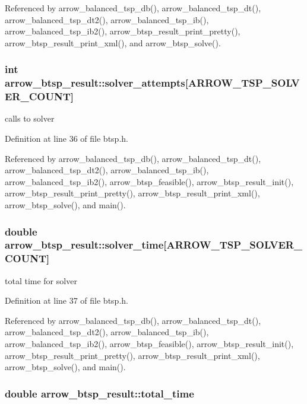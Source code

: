 Referenced by arrow\_\-balanced\_\-tsp\_\-db(), arrow\_\-balanced\_\-tsp\_\-dt(), arrow\_\-balanced\_\-tsp\_\-dt2(), arrow\_\-balanced\_\-tsp\_\-ib(), arrow\_\-balanced\_\-tsp\_\-ib2(), arrow\_\-btsp\_\-result\_\-print\_\-pretty(), arrow\_\-btsp\_\-result\_\-print\_\-xml(), and arrow\_\-btsp\_\-solve().\hypertarget{structarrow__btsp__result_b1d423ab6eda81de4c3bde1685976593}{
\subsubsection[{solver\_\-attempts}]{\setlength{\rightskip}{0pt plus 5cm}int {\bf arrow\_\-btsp\_\-result::solver\_\-attempts}\mbox{[}ARROW\_\-TSP\_\-SOLVER\_\-COUNT\mbox{]}}}
\label{structarrow__btsp__result_b1d423ab6eda81de4c3bde1685976593}


calls to solver 

Definition at line 36 of file btsp.h.

Referenced by arrow\_\-balanced\_\-tsp\_\-db(), arrow\_\-balanced\_\-tsp\_\-dt(), arrow\_\-balanced\_\-tsp\_\-dt2(), arrow\_\-balanced\_\-tsp\_\-ib(), arrow\_\-balanced\_\-tsp\_\-ib2(), arrow\_\-btsp\_\-feasible(), arrow\_\-btsp\_\-result\_\-init(), arrow\_\-btsp\_\-result\_\-print\_\-pretty(), arrow\_\-btsp\_\-result\_\-print\_\-xml(), arrow\_\-btsp\_\-solve(), and main().\hypertarget{structarrow__btsp__result_f13227603570821a0ba7d6466f39f00c}{
\subsubsection[{solver\_\-time}]{\setlength{\rightskip}{0pt plus 5cm}double {\bf arrow\_\-btsp\_\-result::solver\_\-time}\mbox{[}ARROW\_\-TSP\_\-SOLVER\_\-COUNT\mbox{]}}}
\label{structarrow__btsp__result_f13227603570821a0ba7d6466f39f00c}


total time for solver 

Definition at line 37 of file btsp.h.

Referenced by arrow\_\-balanced\_\-tsp\_\-db(), arrow\_\-balanced\_\-tsp\_\-dt(), arrow\_\-balanced\_\-tsp\_\-dt2(), arrow\_\-balanced\_\-tsp\_\-ib(), arrow\_\-balanced\_\-tsp\_\-ib2(), arrow\_\-btsp\_\-feasible(), arrow\_\-btsp\_\-result\_\-init(), arrow\_\-btsp\_\-result\_\-print\_\-pretty(), arrow\_\-btsp\_\-result\_\-print\_\-xml(), arrow\_\-btsp\_\-solve(), and main().\hypertarget{structarrow__btsp__result_dea5711f0a574d98f66d1b20011a68de}{
\subsubsection[{total\_\-time}]{\setlength{\rightskip}{0pt plus 5cm}double {\bf arrow\_\-btsp\_\-result::total\_\-time}}}
\label{structarrow__btsp__result_dea5711f0a574d98f66d1b20011a68de}


